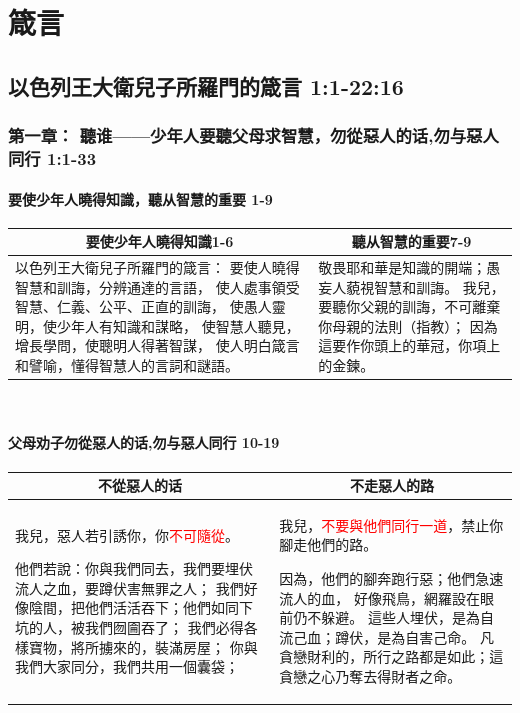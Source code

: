 \chapter{箴言}

\section{以色列王大衛兒子所羅門的箴言 1:1-22:16}
\subsection{第一章： 聽谁——少年人要聽父母求智慧，勿從惡人的话,勿与惡人同行  1:1-33}
\subsubsection{要使少年人曉得知識，聽从智慧的重要 1-9}
\begin{table}[H]
\centering
\begin{tabular}{p{10.5cm}|p{6.5cm}}\hline\hline
\multicolumn{1}{c|}{要使少年人曉得知識1-6}&\multicolumn{1}{c}{聽从智慧的重要7-9}\\\hline
以色列王大衛兒子所羅門的箴言：
要使人曉得智慧和訓誨，分辨通達的言語，
使人處事領受智慧、仁義、公平、正直的訓誨，
使愚人靈明，使少年人有知識和謀略，
使智慧人聽見，增長學問，使聰明人得著智謀，
使人明白箴言和譬喻，懂得智慧人的言詞和謎語。
&敬畏耶和華是知識的開端；愚妄人藐視智慧和訓誨。
我兒，要聽你父親的訓誨，不可離棄你母親的法則（指教）；
因為這要作你頭上的華冠，你項上的金鍊。\\\hline
\end{tabular}
\end{table} 

\subsubsection{父母劝子勿從惡人的话,勿与惡人同行 10-19}
\begin{table}[H]
\centering
\begin{tabular}{p{8.75cm}|p{8.00cm}}\hline\hline
\multicolumn{1}{c|}{不從惡人的话}&\multicolumn{1}{c}{不走惡人的路}\\\hline
我兒，惡人若引誘你，你\textcolor{red}{不可隨從}。

他們若說：你與我們同去，我們要埋伏流人之血，要蹲伏害無罪之人；
我們好像陰間，把他們活活吞下；他們如同下坑的人，被我們囫圇吞了；
我們必得各樣寶物，將所擄來的，裝滿房屋；
你與我們大家同分，我們共用一個囊袋；
&我兒，\textcolor{red}{不要與他們同行一道}，禁止你腳走他們的路。

因為，他們的腳奔跑行惡；他們急速流人的血，
好像飛鳥，網羅設在眼前仍不躲避。
這些人埋伏，是為自流己血；蹲伏，是為自害己命。
凡貪戀財利的，所行之路都是如此；這貪戀之心乃奪去得財者之命。
\\\hline
\end{tabular}
\end{table} 



